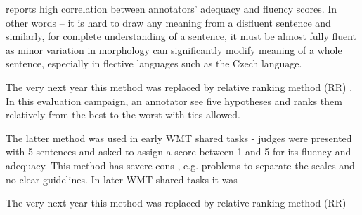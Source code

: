 \cite{callison-burch-etal-2007-meta} reports high correlation between annotators’ adequacy and fluency scores. In other words -- it is hard to draw any meaning from a disfluent sentence and similarly, for complete understanding of a sentence, it must be almost fully fluent as minor variation in morphology can significantly modify meaning of a whole sentence, especially in flective languages such as the Czech language. 

The very next year this method was replaced by relative ranking method (RR) \citep{callison-burch-etal-2007-meta}. In this evaluation campaign, an annotator see five hypotheses and ranks them relatively from the best to the worst with ties allowed.


The latter method was used in early WMT shared tasks - judges were presented with 5 sentences and asked to assign a score between 1 and 5 for its fluency and adequacy. This method has severe cons \citep{callison-burch-etal-2007-meta}, e.g. problems to separate the scales and no clear guidelines. 
In later WMT shared tasks it was


The very next year this method was replaced by relative ranking method (RR) \citep{callison-burch-etal-2007-meta}

